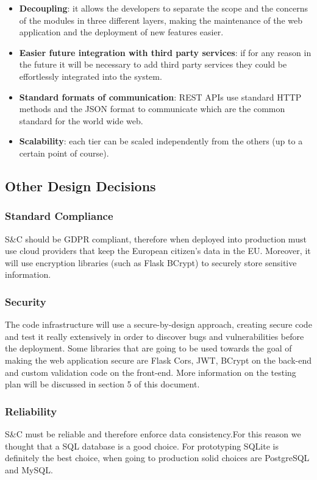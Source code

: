 \begin{itemize}
    \item \textbf{Decoupling}: it allows the developers to separate the scope and the concerns of the modules in three different layers, making the maintenance of the web application and the deployment of new features easier.
    \item \textbf{Easier future integration with third party services}: if for any reason in the future it will be necessary to add third party services they could be  effortlessly integrated into the system. 
    \item \textbf{Standard formats of communication}: REST APIs use standard HTTP methods and the JSON format to communicate which are the common standard for the world wide web.
    \item \textbf{Scalability}: each tier can be scaled independently from the others (up to a certain point of course).
\end{itemize}
\subsection{Other Design Decisions}

\subsubsection{Standard Compliance}
S\&C should be GDPR compliant, therefore when deployed into production must use cloud providers that keep the European citizen's data in the EU. Moreover, it will use encryption libraries (such as Flask BCrypt) to securely store sensitive information. 

\subsubsection{Security}
The code infrastructure will use a secure-by-design approach, creating secure code and test it really extensively in order to discover bugs and vulnerabilities before the deployment. Some libraries that are going to be used towards the goal of making the web application secure are Flask Cors, JWT, BCrypt on the back-end and custom validation code on the front-end. More information on the testing plan will be discussed in section 5 of this document.

\subsubsection{Reliability}
S\&C must be reliable and therefore enforce data consistency.For this reason we thought that a SQL database is a good choice. For prototyping SQLite is definitely the best choice, when going to production solid choices are PostgreSQL and MySQL.

